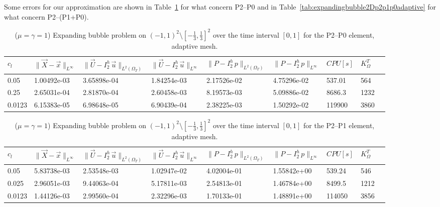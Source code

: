 \documentclass[a4paper,12pt,onecolumn]{article}
\newcommand{\errorXx}{\|\vec{X} - \vec{x}\|_{L^\infty}}
\newcommand{\LerrorUu}[1]{\|\vec U - I^h_{#1}\,\vec u\|_{L^2(\Omega_T)}}
\newcommand{\errorUu}[1]{\|\vec U - I^h_{#1}\,\vec u\|_{L^\infty}}
\newcommand{\errorPp}[1]{\|P - I^h_{#1}\,p\|_{L^\infty}}
\newcommand{\LerrorPp}[1]{\|P - I^h_{#1}\,p\|_{L^2(\Omega_T)}}
\begin{document}
Some errors for our approximation are shown in Table~\ref{tab:expandingbubble2Dp2p0adaptive} for what concern P2--P0 and in Table~\ref{tab:expandingbubble2Dp2p1p0adaptive} for what concern P2--(P1+P0).

\begin{table}
 \center
 \hspace*{-2cm}
\begin{tabular}{lllllllll}
\hline
$c_l$ & $\errorXx$ & $\LerrorUu2$ & $\errorUu2$ & $\LerrorPp2$ & $\errorPp2$ & $CPU[s]$ & $K_\Omega^T$\\
\hline
0.05 & 1.00492e-03 & 3.65898e-04 & 1.84254e-03 & 2.17526e-02 & 4.75296e-02 & 537.01 & 564\\
0.25 & 2.65031e-04 & 2.81870e-04 & 2.60458e-03 & 8.19573e-03 & 5.09886e-02 & 8686.3 & 1232\\
0.0123 & 6.15383e-05 & 6.98648e-05 & 6.90439e-04 & 2.38225e-03 & 1.50292e-02 & 119900 & 3860\\
\hline
\end{tabular}
\hspace*{-2cm}
\caption{($\mu=\gamma=1$) Expanding bubble problem on $(-1,1)^2\setminus[-\frac{1}{3},\frac{1}{3}]^2$ over the time interval $[0,1]$ for the P2--P0 element, adaptive mesh.}
\label{tab:expandingbubble2Dp2p0adaptive}
\end{table}

\begin{table}
 \center
 \hspace*{-2cm}
\begin{tabular}{lllllllll}
\hline
$c_l$ & $\errorXx$ & $\LerrorUu2$ & $\errorUu2$ & $\LerrorPp2$ & $\errorPp2$ & $CPU[s]$ & $K_\Omega^T$\\
\hline
0.05 & 5.83738e-03 & 2.53548e-03 & 1.02947e-02 & 4.02004e-01 & 1.55842e+00 & 539.24 & 546\\
0.025 & 2.96051e-03 & 9.44063e-04 & 5.17811e-03 & 2.54813e-01 & 1.46784e+00 & 8499.5 & 1212\\
0.0123 & 1.44126e-03 & 2.99560e-04 & 2.32296e-03 & 1.70133e-01 & 1.48891e+00 & 114050 & 3856\\
\hline
\end{tabular}
\hspace*{-2cm}
\caption{($\mu=\gamma=1$) Expanding bubble problem on $(-1,1)^2\setminus[-\frac{1}{3},\frac{1}{3}]^2$ over the time interval $[0,1]$ for the P2--P1 element, adaptive mesh.}
\label{tab:expandingbubble2Dp2p1adaptive}
\end{table}
\end{document}
